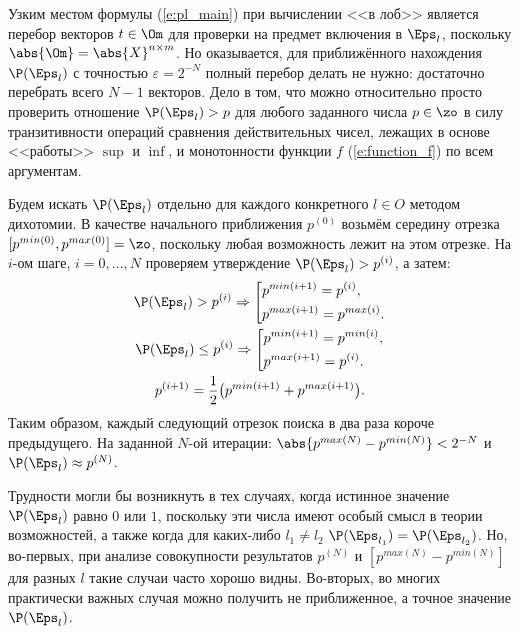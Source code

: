 Узким местом формулы (\ref{e:pl_main}) при вычислении <<в лоб>> является перебор векторов $t \in \Om$ для проверки на предмет включения в $\Eps_l$, поскольку $\abs{\Om} = \abs{X}^{n \times m}$. Но оказывается, для приближённого нахождения $\P(\Eps_l)$ с точностью $\varepsilon = 2^{-N}$ полный перебор делать не нужно: достаточно перебрать всего $N-1$ векторов. Дело в том, что можно относительно просто проверить отношение $\P(\Eps_l) > p$ для любого заданного числа $p \in \zo$ в силу транзитивности операций сравнения действительных чисел, лежащих в основе <<работы>>  $\sup$ и $\inf$, и монотонности функции $f$ (\ref{e:function_f}) по всем аргументам. 

Будем искать $\P(\Eps_l)$ отдельно для каждого конкретного $l \in O$ методом дихотомии. В качестве начального приближения $p^{(0)}$ возьмём середину отрезка $[p^{min(0)}, p^{max(0)}] = \zo$, поскольку любая возможность лежит на этом отрезке. На $i$-ом шаге, $i = 0, ..., N$ проверяем утверждение $\P(\Eps_l) > p^{(i)}$, а затем:
\begin{gather*}
 \P(\Eps_l) > p^{(i)} \Rightarrow 
    \left[ 
      \begin{gathered} 
        p^{min(i+1)} = p^{(i)}, \hfill 
        \\ 
        p^{max(i+1)} = p^{max(i)}. \hfill 
        \\ 
      \end{gathered} 
    \right. \\ 
 \P(\Eps_l) \leq p^{(i)} \Rightarrow 
    \left[ 
      \begin{gathered} 
        p^{min(i+1)} = p^{min(i)}, \hfill 
        \\ 
        p^{max(i+1)} = p^{(i)}. \hfill 
        \\ 
      \end{gathered} 
    \right. \\
 p^{(i+1)} = \frac{1}{2}\big(p^{min(i+1)} + p^{max(i+1)}\big).  
\end{gather*}
Таким образом, каждый следующий отрезок поиска в два раза короче предыдущего. На заданной $N$-ой итерации: $\abs{p^{max(N)} - p^{min(N)}} < 2^{-N}$ и $\P(\Eps_l) \approx p^{(N)}$. %

Трудности могли бы возникнуть в тех случаях, когда истинное значение $\P(\Eps_l)$ равно $0$ или $1$, поскольку эти числа имеют особый смысл в теории возможностей, а также когда для каких-либо $l_1 \neq l_2$ $\P(\Eps_{l_1}) = \P(\Eps_{l_2})$. Но, во-первых, при анализе совокупности результатов $p^{(N)}$ и $[p^{max(N)} - p^{min(N)}]$ для разных $l$ такие случаи часто хорошо видны. Во-вторых, во многих практически важных случая можно получить не приближенное, а точное значение $\P(\Eps_l)$. 

